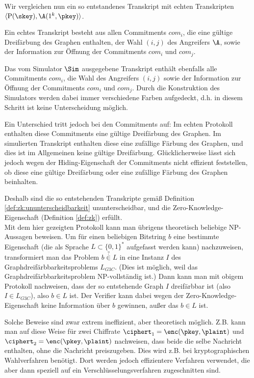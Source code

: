 Wir vergleichen nun ein so entstandenes Transkript mit echten Transkripten $\langle \mathrm{P}(\skey), \A(1^k, \pkey) \rangle$.

Ein echtes Transkript besteht aus allen Commitments $com_i$, die eine gültige Dreifärbung des Graphen enthalten, der Wahl $(i,j)$ des Angreifers $\A$, sowie der Information zur Öffnung der Commitments $com_i$ und $com_j$.

Das vom Simulator $\Sim$ ausgegebene Transkript enthält ebenfalls alle Commitments $com_i$, die Wahl des Angreifers $(i,j)$ sowie der Information zur Öffnung der Commitments $com_i$ und $com_j$. Durch die Konstruktion des Simulators werden dabei immer verschiedene Farben aufgedeckt, d.h. in diesem Schritt ist keine Unterscheidung möglich.

Ein Unterschied tritt jedoch bei den Commitments auf: Im echten Protokoll enthalten diese Commitments eine gültige Dreifärbung des Graphen. Im simulierten Transkript enthalten diese eine zufällige Färbung des Graphen, und dies ist im Allgemeinen keine gültige Dreifärbung.
Glücklicherweise lässt sich jedoch wegen der Hiding-Eigenschaft der Commitments nicht effizient feststellen, ob diese eine gültige Dreifärbung oder eine zufällige Färbung des Graphen beinhalten.

Deshalb sind die so entstehenden Transkripte gemäß Definition \ref{def:zk:ununterscheidbarkeit} ununterscheidbar, und die Zero-Knowledge-Eigenschaft (Definition \ref{def:zk}) erfüllt.\\

Mit dem hier gezeigten Protokoll kann man übrigens theoretisch beliebige NP-Aussagen beweisen.
Um für einen beliebigen Bitstring $b$ eine bestimmte Eigenschaft (die als Sprache $L \subset \{0,1\}^*$ aufgefasst werden kann) nachzuweisen, transformiert man das Problem $b \stackrel{?}{\in} L$ in eine Instanz $I$ des Graphdreifärbbarkeitsproblems $L_{G3C}$.
(Dies ist möglich, weil das Graphdreifärbbarkeitsproblem NP-vollständig ist.)
Dann kann man mit obigem Protokoll nachweisen, dass der so entstehende Graph $I$ dreifärbbar ist (also $I \in L_{G3C}$), also $b \in L$ ist.
Der Verifier kann dabei wegen der Zero-Knowledge-Eigenschaft keine Information über $b$ gewinnen, außer das $b \in L$ ist.

Solche Beweise sind zwar extrem ineffizient, aber theoretisch möglich.
Z.B. kann man auf diese Weise für zwei Chiffrate $\ciphert_1 = \enc(\pkey, \plaint)$ und $\ciphert_2 = \enc(\pkey, \plaint)$ nachweisen, dass beide die selbe Nachricht enthalten, ohne die Nachricht preiszugeben.
Dies wird z.B. bei kryptographischen Wahlverfahren benötigt.
Dort werden jedoch effizientere Verfahren verwendet, die aber dann speziell auf ein Verschlüsselungsverfahren zugeschnitten sind.

